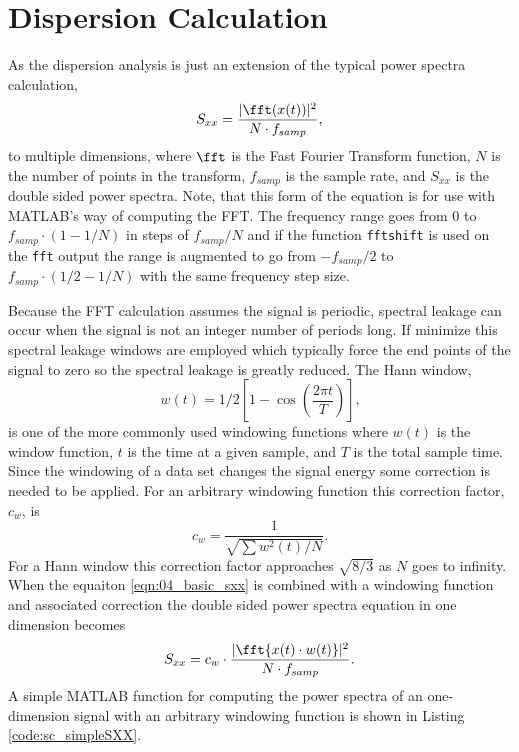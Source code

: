 \section{Dispersion Calculation}
As the dispersion analysis is just an extension of the typical power spectra calculation,
\begin{equation}
  S_{xx} = \frac{|\fft(x(t))|^2}{N\cdot f_{samp}} \textrm{,}
  \label{eqn:04_basic_sxx}
\end{equation}
to multiple dimensions, where $\fft$ is the Fast Fourier Transform function, $N$ is the number of points in the transform, $f_{samp}$ is the sample rate, and $S_{xx}$ is the double sided power spectra.
Note, that this form of the equation is for use with MATLAB's way of computing the FFT.
The frequency range goes from $0$ to $f_{samp}\cdot(1-1/N)$ in steps of $f_{samp}/N$ and if the function \lstinline{fftshift} is used on the \lstinline{fft} output the range is augmented to go from $-f_{samp}/2$ to $f_{samp}\cdot(1/2-1/N)$ with the same frequency step size.

Because the FFT calculation assumes the signal is periodic, spectral leakage can occur when the signal is not an integer number of periods long.
If minimize this spectral leakage windows are employed which typically force the end points of the signal to zero so the spectral leakage is greatly reduced.
The Hann window,
\begin{equation}
  w(t) = 1/2\left[1-\cos\left(\frac{2\pi t}{T}\right)\right] \textrm{,}
  \label{eqn:04_hann_window}
\end{equation}
is one of the more commonly used windowing functions where $w(t)$ is the window function, $t$ is the time at a given sample, and $T$ is the total sample time.
Since the windowing of a data set changes the signal energy some correction is needed to be applied.
For an arbitrary windowing function this correction factor, $c_w$, is
\begin{equation}
  c_w = \frac{1}{\sqrt{\sum w^2(t)/N}} \textrm{.}
  \label{eqn:04_window_correction}
\end{equation}
For a Hann window this correction factor approaches $\sqrt{8/3}$ as $N$ goes to infinity.
When the equaiton \ref{eqn:04_basic_sxx} is combined with a windowing function and associated correction the double sided power spectra equation in one dimension becomes
\begin{equation}
  S_{xx} = c_w\cdot\frac{|\fft\{x(t)\cdot w(t)\}|^2}{N\cdot f_{samp}} \textrm{.}
  \label{eqn:04_windowed_sxx}
\end{equation}
A simple MATLAB function for computing the power spectra of an one-dimension signal with an arbitrary windowing function is shown in Listing \ref{code:sc_simpleSXX}.

